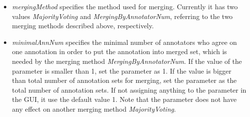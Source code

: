 \begin{itemize}
\item {\em mergingMethod} specifies the method used for merging. Currently it has two 
values {\em MajorityVoting} and {\em MergingByAnnotatorNum}, referring to the two merging
methods described above, respectively.
\item {\em minimalAnnNum} specifies the minimal number of annotators who agree 
on one annotation in order to put the annotation into merged set, which is needed by
 the merging method {\em MergingByAnnotatorNum}. If the value of the parameter is smaller than 1,
set the parameter as 1. If the value is bigger than total number of annotation sets
for merging, set the parameter as the total number of annotation sets. If not assigning 
anything to the parameter in the GUI, it use the default value 1. Note that the parameter
does not have any effect on another merging method {\em MajorityVoting}.
\end{itemize}

